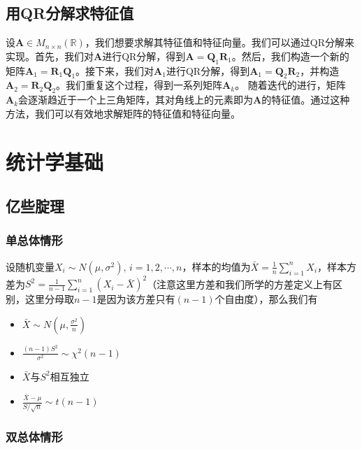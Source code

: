 \documentclass[a4paper, 12pt]{article}
\begin{document}
    \subsection{用QR分解求特征值}

    设$\boldsymbol A\in M_{n\times n}(\mathbb R)$，我们想要求解其特征值和特征向量。我们可以通过QR分解来实现。首先，我们对$\boldsymbol A$进行QR分解，得到$\boldsymbol A=\boldsymbol Q_1\boldsymbol R_1$。然后，我们构造一个新的矩阵$\boldsymbol A_1=\boldsymbol R_1\boldsymbol Q_1$。接下来，我们对$\boldsymbol A_1$进行QR分解，得到$\boldsymbol A_1=\boldsymbol Q_2\boldsymbol R_2$，并构造$\boldsymbol A_2=\boldsymbol R_2\boldsymbol Q_2$。我们重复这个过程，得到一系列矩阵$\boldsymbol A_k$。 随着迭代的进行，矩阵$\boldsymbol A_k$会逐渐趋近于一个上三角矩阵，其对角线上的元素即为$\boldsymbol A$的特征值。通过这种方法，我们可以有效地求解矩阵的特征值和特征向量。

    \section{统计学基础}

    \subsection{亿些腚理}
    
    \subsubsection{单总体情形}

    设随机变量$X_i\sim N(\mu,\sigma^2),\,i=1,2,\cdots,n$，样本的均值为$\bar{X}=\frac{1}{n}\sum_{i=1}^n X_i$，样本方差为$S^2=\frac{1}{n-1}\sum_{i=1}^n (X_i-\bar{X})^2$（注意这里方差和我们所学的方差定义上有区别，这里分母取$n-1$是因为该方差只有$(n-1)$个自由度），那么我们有

    \begin{itemize}
        \item $\bar{X}\sim N\left(\mu,\frac{\sigma^2}{n}\right)$
        \item $\frac{(n-1)S^2}{\sigma^2}\sim\chi^2(n-1)$
        \item $\bar{X}$与$S^2$相互独立
        \item $\frac{\bar{X}-\mu}{S/\sqrt{n}}\sim t(n-1)$
    \end{itemize}

    \subsubsection{双总体情形}
\end{document}
